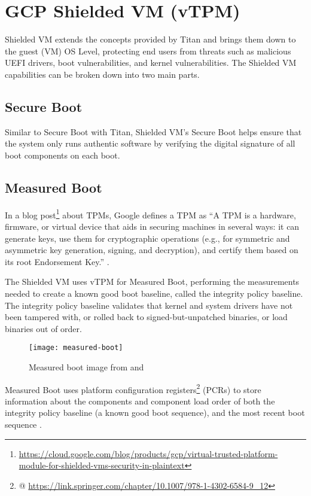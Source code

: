 
\section{GCP Shielded VM (vTPM)}


Shielded VM extends the concepts provided by Titan 
and brings them down to the guest (VM) OS Level, 
protecting end users from threats such as malicious UEFI drivers, 
boot vulnerabilities, and kernel vulnerabilities. 
The Shielded VM capabilities can be broken down into two main parts.

\subsection{Secure Boot}
Similar to Secure Boot with Titan, 
Shielded VM’s Secure Boot helps ensure that the system only runs authentic software 
by verifying the digital signature of all boot components on each boot.

\subsection{Measured Boot}
In a blog post\footnote{\url{https://cloud.google.com/blog/products/gcp/virtual-trusted-platform-module-for-shielded-vms-security-in-plaintext}} 
about TPMs, Google defines a TPM as 
“A TPM is a hardware, firmware, or virtual device that aids in securing machines 
in several ways: it can generate keys, use them for cryptographic operations 
(e.g., for symmetric and asymmetric key generation, signing, and decryption), 
and certify them based on its root Endorsement Key.” 
\citep{zimmerman_virtual_2018}.

The Shielded VM uses vTPM for Measured Boot, 
performing the measurements needed to create a known good boot baseline, 
called the integrity policy baseline. 
The integrity policy baseline validates that kernel and system drivers 
have not been tampered with, or rolled back to signed-but-unpatched binaries,
or load binaries out of order.

\begin{figure}[!ht]
    \centering
    \texttt{[image: measured-boot]}
    \caption{Measured boot image from \cite{leibl_gcp_2022} and \cite{google_what_2022}}
    \label{fig:measured-boot}
\end{figure}


Measured Boot uses 
platform configuration registers\footnote{\cite{arthur_platform_2015} @ \url{https://link.springer.com/chapter/10.1007/978-1-4302-6584-9_12}} 
(PCRs) 
to store information about the components and component load order 
of both the integrity policy baseline 
(a known good boot sequence), 
and the most recent boot sequence 
\citep{arthur_platform_2015}.

